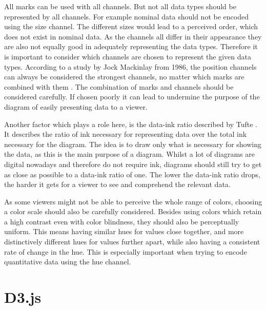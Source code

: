 All marks can be used with all channels. But not all data types should be represented by all channels. For example nominal data should not be encoded using the size channel. The different sizes would lead to a perceived order, which does not exist in nominal data. As the channels all differ in their appearance they are also not equally good in adequately representing the data types. Therefore it is important to consider which channels are chosen to represent the given data types. According to a study by Jock Mackinlay from 1986, the position channels can always be considered the strongest channels, no matter which marks are combined with them \cite{mackinlay1986automating}. The combination of marks and channels should be considered carefully. If chosen poorly it can lead to undermine the purpose of the diagram of easily presenting data to a viewer.

Another factor which plays a role here, is the data-ink ratio described by Tufte \cite{tufte}. It describes the ratio of ink necessary for representing data over the total ink necessary for the diagram. The idea is to draw only what is necessary for showing the data, as this is the main purpose of a diagram. Whilst a lot of diagrams are digital nowadays and therefore do not require ink, diagrams should still try to get as close as possible to a data-ink ratio of one. The lower the data-ink ratio drops, the harder it gets for a viewer to see and comprehend the relevant data.

As some viewers might not be able to perceive the whole range of colors, choosing a color scale should also be carefully considered. Besides using colors which retain a high contrast even with color blindness, they should also be perceptually uniform. This means having similar hues for values close together, and more distinctively different hues for values further apart, while also having a consistent rate of change in the hue. This is especially important when trying to encode quantitative data using the hue channel.


\section{D3.js}\label{sec:d3}

